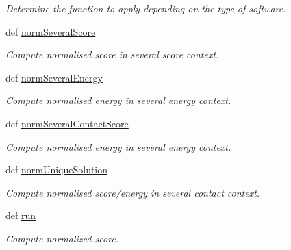 \begin{DoxyCompactItemize}
\begin{DoxyCompactList}\small\item\em \-Determine the function to apply depending on the type of software. \end{DoxyCompactList}\item 
def \hyperlink{classMycarn__stat_1_1NormScore_1_1NormScore_aaa3e70e449dc264cc2eb18df109a1457}{norm\-Several\-Score}
\begin{DoxyCompactList}\small\item\em \-Compute normalised score in several score context. \end{DoxyCompactList}\item 
def \hyperlink{classMycarn__stat_1_1NormScore_1_1NormScore_a77de4bd185d2aa6b047d515c8a6caccc}{norm\-Several\-Energy}
\begin{DoxyCompactList}\small\item\em \-Compute normalised energy in several energy context. \end{DoxyCompactList}\item 
def \hyperlink{classMycarn__stat_1_1NormScore_1_1NormScore_a568602cecbe89859753dd87dddff33b1}{norm\-Several\-Contact\-Score}
\begin{DoxyCompactList}\small\item\em \-Compute normalised energy in several energy context. \end{DoxyCompactList}\item 
def \hyperlink{classMycarn__stat_1_1NormScore_1_1NormScore_ad0d2700f64c8cf3ab450f52e4919494d}{norm\-Unique\-Solution}
\begin{DoxyCompactList}\small\item\em \-Compute normalised score/energy in several contact context. \end{DoxyCompactList}\item 
\hypertarget{classMycarn__stat_1_1NormScore_1_1NormScore_a14ed3bfae5bb566d730e04a1f4d8dc55}{
def \hyperlink{classMycarn__stat_1_1NormScore_1_1NormScore_a14ed3bfae5bb566d730e04a1f4d8dc55}{run}}
\label{classMycarn__stat_1_1NormScore_1_1NormScore_a14ed3bfae5bb566d730e04a1f4d8dc55}

\begin{DoxyCompactList}\small\item\em \-Compute normalized score. \end{DoxyCompactList}\end{DoxyCompactItemize}
